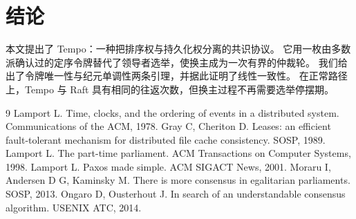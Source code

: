 \documentclass[12pt]{ctexart}
\begin{document}
\section{结论}
本文提出了 Tempo：一种把排序权与持久化权分离的共识协议。
它用一枚由多数派确认过的定序令牌替代了领导者选举，使换主成为一次有界的仲裁轮。
我们给出了令牌唯一性与纪元单调性两条引理，并据此证明了线性一致性。
在正常路径上，Tempo 与 Raft 具有相同的往返次数，但换主过程不再需要选举停摆期。

\begin{thebibliography}{9}
 Lamport L. Time, clocks, and the ordering of events in a distributed system. Communications of the ACM, 1978.
 Gray C, Cheriton D. Leases: an efficient fault-tolerant mechanism for distributed file cache consistency. SOSP, 1989.
 Lamport L. The part-time parliament. ACM Transactions on Computer Systems, 1998.
 Lamport L. Paxos made simple. ACM SIGACT News, 2001.
 Moraru I, Andersen D G, Kaminsky M. There is more consensus in egalitarian parliaments. SOSP, 2013.
 Ongaro D, Ousterhout J. In search of an understandable consensus algorithm. USENIX ATC, 2014.
\end{thebibliography}
\end{document}
